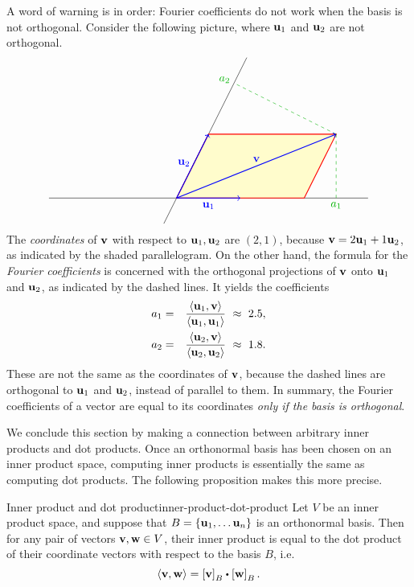 A word of warning is in order: Fourier coefficients do not work when
the basis is not orthogonal. Consider the following picture, where
$\vect{u}_1$ and $\vect{u}_2$ are not orthogonal.
\begin{equation*}
  \begin{tikzpicture}[scale=2]
    \draw (-2,0) -- (3,0);
    \draw (-0.2,-0.4) -- (1.1,2.2);
    \draw[thick,red,fill=yellow!20] (0,0) -- (2,0) -- (2.5,1) -- (0.5,1) -- cycle;
    \draw[dashed,green!70!black] (2.5,1) -- (2.5,0) node[below]{$a_1$};
    \draw[dashed,green!70!black] (2.5,1) -- (0.9,1.8) node[left,yshift=3]{$a_2$};
    \draw[thick,blue,->] (0,0) -- node[below]{$\vect{u}_1$} (1,0);
    \draw[thick,blue,->] (0,0) -- node[left, pos=0.55]{$\vect{u}_2$} (0.5,1);
    \draw[thick,blue,->] (0,0) -- node[above]{$\vect{v}$} (2.5,1);
  \end{tikzpicture}
\end{equation*}
The {\em coordinates} of $\vect{v}$ with respect to
$\vect{u}_1,\vect{u}_2$ are $(2,1)$, because
$\vect{v}=2\vect{u}_1+1\vect{u}_2$, as indicated by the shaded
parallelogram. On the other hand, the formula for the {\em Fourier
  coefficients} is concerned with the orthogonal projections of
$\vect{v}$ onto $\vect{u}_1$ and $\vect{u}_2$, as indicated by the
dashed lines. It yields the coefficients
\begin{eqnarray*}
  a_1 &=& \frac{\iprod{\vect{u}_1,\vect{v}}}{\iprod{\vect{u}_1,\vect{u}_1}} ~\approx~ 2.5, \\
  a_2 &=& \frac{\iprod{\vect{u}_2,\vect{v}}}{\iprod{\vect{u}_2,\vect{u}_2}} ~\approx~ 1.8.
\end{eqnarray*}
These are not the same as the coordinates of $\vect{v}$, because the
dashed lines are orthogonal to $\vect{u}_1$ and $\vect{u}_2$, instead
of parallel to them. In summary, the Fourier coefficients of a vector
are equal to its coordinates {\em only if the basis is orthogonal}.

We conclude this section by making a connection between arbitrary
inner products and dot products.  Once an orthonormal basis has been
chosen on an inner product space, computing inner products is
essentially the same as computing dot products. The following
proposition makes this more precise.

\begin{proposition}{Inner product and dot product}{inner-product-dot-product}
  Let $V$ be an inner product space, and suppose that
  $B=\set{\vect{u}_1,\ldots\vect{u}_n}$ is an orthonormal basis. Then
  for any pair of vectors $\vect{v},\vect{w}\in V$, their inner
  product is equal to the dot product of their coordinate vectors with
  respect to the basis $B$, i.e.
  \begin{equation*}
    \iprod{\vect{v},\vect{w}}
    = \coord{\vect{v}}_B \dotprod \coord{\vect{w}}_B.
  \end{equation*}
\end{proposition}

